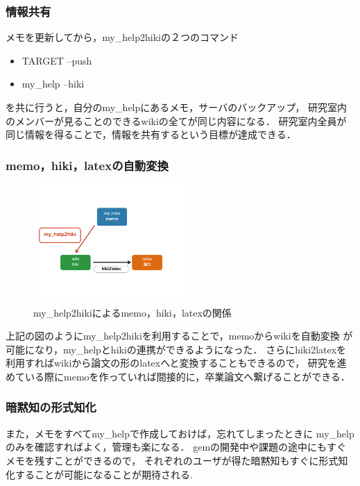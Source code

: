 \subsubsection{情報共有}
メモを更新してから，my\_help2hikiの２つのコマンド

\begin{itemize}
\item TARGET --push
\item my\_help --hiki
\end{itemize}
を共に行うと，自分のmy\_helpにあるメモ，サーバのバックアップ，
研究室内のメンバーが見ることのできるwikiの全てが同じ内容になる．
研究室内全員が同じ情報を得ることで，情報を共有するという目標が達成できる．

\subsubsection{memo，hiki，latexの自動変換}
\begin{figure}[htbp]\begin{center}
\includegraphics[width=6cm,bb=0 0 442 500]{../figs/./my_help2hiki_saki.006.png}
\caption{ my\_help2hikiによるmemo，hiki，latexの関係}
\label{default}\end{center}\end{figure}
上記の図のようにmy\_help2hikiを利用することで，memoからwikiを自動変換
が可能になり，my\_helpとhikiの連携ができるようになった．
さらにhiki2latexを利用すればwikiから論文の形のlatexへと変換することもできるので，
研究を進めている際にmemoを作っていれば間接的に，卒業論文へ繋げることができる．

\subsubsection{暗黙知の形式知化}
また，メモをすべてmy\_helpで作成しておけば，忘れてしまったときに
my\_helpのみを確認すればよく，管理も楽になる．
gemの開発中や課題の途中にもすぐメモを残すことができるので，
それぞれのユーザが得た暗黙知もすぐに形式知化することが可能になることが期待される.

